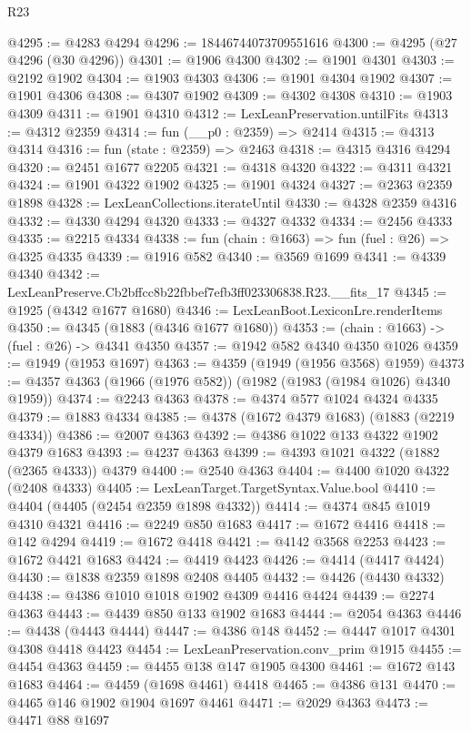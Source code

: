 \begin{lexlean}{R23}
\begin{coremodule}
@4295 := @4283 @4294
@4296 := 18446744073709551616
@4300 := @4295 (@27 @4296 (@30 @4296))
@4301 := @1906 @4300
@4302 := @1901 @4301
@4303 := @2192 @1902
@4304 := @1903 @4303
@4306 := @1901 @4304 @1902
@4307 := @1901 @4306
@4308 := @4307 @1902
@4309 := @4302 @4308
@4310 := @1903 @4309
@4311 := @1901 @4310
@4312 := LexLeanPreservation.untilFits
@4313 := @4312 @2359
@4314 := fun (__p0 : @2359) => @2414
@4315 := @4313 @4314
@4316 := fun (state : @2359) => @2463
@4318 := @4315 @4316 @4294
@4320 := @2451 @1677 @2205
@4321 := @4318 @4320
@4322 := @4311 @4321
@4324 := @1901 @4322 @1902
@4325 := @1901 @4324
@4327 := @2363 @2359 @1898
@4328 := LexLeanCollections.iterateUntil
@4330 := @4328 @2359 @4316
@4332 := @4330 @4294 @4320
@4333 := @4327 @4332
@4334 := @2456 @4333
@4335 := @2215 @4334
@4338 := fun (chain : @1663) => fun (fuel : @26) => @4325 @4335
@4339 := @1916 @582
@4340 := @3569 @1699
@4341 := @4339 @4340
@4342 := LexLeanPreserve.Cb2bffcc8b22fbbef7efb3ff023306838.R23.__fits_17
@4345 := @1925 (@4342 @1677 @1680)
@4346 := LexLeanBoot.LexiconLre.renderItems
@4350 := @4345 (@1883 (@4346 @1677 @1680))
@4353 := (chain : @1663) -> (fuel : @26) -> @4341 @4350
@4357 := @1942 @582 @4340 @4350 @1026
@4359 := @1949 (@1953 @1697)
@4363 := @4359 (@1949 (@1956 @3568) @1959)
@4373 := @4357 @4363 (@1966 (@1976 @582)) (@1982 (@1983 (@1984 @1026) @4340 @1959))
@4374 := @2243 @4363
@4378 := @4374 @577 @1024 @4324 @4335
@4379 := @1883 @4334
@4385 := @4378 (@1672 @4379 @1683) (@1883 (@2219 @4334))
@4386 := @2007 @4363
@4392 := @4386 @1022 @133 @4322 @1902 @4379 @1683
@4393 := @4237 @4363
@4399 := @4393 @1021 @4322 (@1882 (@2365 @4333)) @4379
@4400 := @2540 @4363
@4404 := @4400 @1020 @4322 (@2408 @4333)
@4405 := LexLeanTarget.TargetSyntax.Value.bool
@4410 := @4404 (@4405 (@2454 @2359 @1898 @4332))
@4414 := @4374 @845 @1019 @4310 @4321
@4416 := @2249 @850 @1683
@4417 := @1672 @4416
@4418 := @142 @4294
@4419 := @1672 @4418
@4421 := @4142 @3568 @2253
@4423 := @1672 @4421 @1683
@4424 := @4419 @4423
@4426 := @4414 (@4417 @4424)
@4430 := @1838 @2359 @1898 @2408 @4405
@4432 := @4426 (@4430 @4332)
@4438 := @4386 @1010 @1018 @1902 @4309 @4416 @4424
@4439 := @2274 @4363
@4443 := @4439 @850 @133 @1902 @1683
@4444 := @2054 @4363
@4446 := @4438 (@4443 @4444)
@4447 := @4386 @148
@4452 := @4447 @1017 @4301 @4308 @4418 @4423
@4454 := LexLeanPreservation.conv_prim @1915
@4455 := @4454 @4363
@4459 := @4455 @138 @147 @1905 @4300
@4461 := @1672 @143 @1683
@4464 := @4459 (@1698 @4461) @4418
@4465 := @4386 @131
@4470 := @4465 @146 @1902 @1904 @1697 @4461
@4471 := @2029 @4363
@4473 := @4471 @88 @1697

\end{coremodule}
\end{lexlean}
